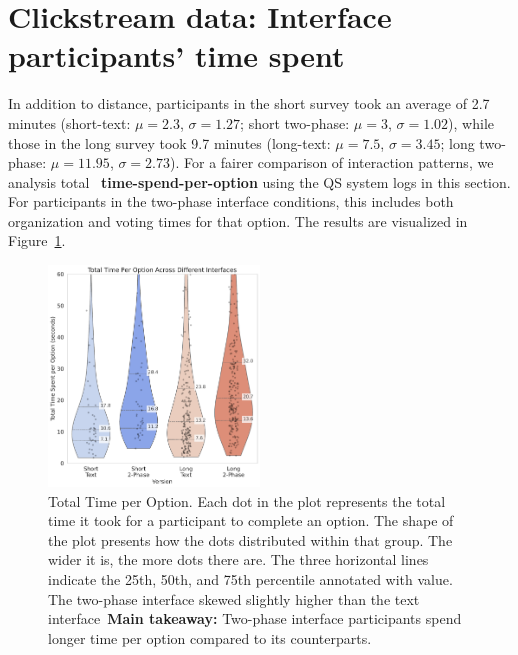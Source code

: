 \section{Clickstream data: Interface participants' time spent}
\label{sec:timeAnalysis}
In addition to distance, participants in the short survey took an average of 2.7 minutes (short-text: $\mu=2.3$, $\sigma=1.27$; short two-phase: $\mu=3$, $\sigma=1.02$), while those in the long survey took 9.7 minutes (long-text: $\mu=7.5$, $\sigma=3.45$; long two-phase: $\mu=11.95$, $\sigma=2.73$). For a fairer comparison of interaction patterns, we analysis total ~\textbf{time-spend-per-option} using the QS system logs in this section. For participants in the two-phase interface conditions, this includes both organization and voting times for that option. The results are visualized in Figure~\ref{fig:total_time}.

\begin{figure}[h]
    \centering
    \includegraphics[width=0.5\textwidth, trim=0 0 0 0, clip]{content/image/time/Total Time Per Option Across Different Interfaces.pdf}
    \captionsetup{width=1\textwidth, justification=justified}
    \caption{Total Time per Option. Each dot in the plot represents the total time it took for a participant to complete an option. The shape of the plot presents how the dots distributed within that group. The wider it is, the more dots there are. The three horizontal lines indicate the 25th, 50th, and 75th percentile annotated with value. The two-phase interface skewed slightly higher than the text interface~\textbf{Main takeaway: } Two-phase interface participants spend longer time per option compared to its counterparts.}
    \label{fig:total_time}
\end{figure}

